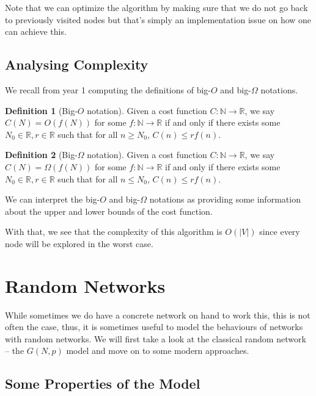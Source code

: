 \documentclass[
]{article}
\theoremstyle{definition}
\newtheorem{definition}{Definition}[section]
\begin{document}
Note that we can optimize the algorithm by making sure that we do not go
back to previously visited nodes but that's simply an implementation
issue on how one can achieve this.

\hypertarget{analysing-complexity}{%
\subsection{Analysing Complexity}\label{analysing-complexity}}

We recall from year 1 computing the definitions of big-\(O\) and
big-\(\Omega\) notations.

\begin{definition}[Big-\(O\) notation]
  Given a cost function \(C : \mathbb{N} \to \mathbb{R}\), we say 
  \(C(N) = O(f(N))\) for some \(f : \mathbb{N} \to \mathbb{R}\) if and only 
  if there exists some \(N_0 \in \mathbb{R}, r \in \mathbb{R}\) such that 
  for all \(n \ge N_0\), \(C(n) \le rf(n)\).
\end{definition}

\begin{definition}[Big-\(\Omega\) notation]
  Given a cost function \(C : \mathbb{N} \to \mathbb{R}\), we say 
  \(C(N) = \Omega(f(N))\) for some \(f : \mathbb{N} \to \mathbb{R}\) if and only 
  if there exists some \(N_0 \in \mathbb{R}, r \in \mathbb{R}\) such that 
  for all \(n \le N_0\), \(C(n) \le rf(n)\).
\end{definition}

We can interpret the big-\(O\) and big-\(\Omega\) notations as providing
some information about the upper and lower bounds of the cost function.

With that, we see that the complexity of this algorithm is
\(O(\left|V\right|)\) since every node will be explored in the worst
case.

\hypertarget{random-networks}{%
\section{Random Networks}\label{random-networks}}

While sometimes we do have a concrete network on hand to work this, this
is not often the case, thus, it is sometimes useful to model the
behaviours of networks with random networks. We will first take a look
at the classical random network -- the \(G(N, p)\) model and move on to
some modern approaches.

\hypertarget{some-properties-of-the-model}{%
\subsection{Some Properties of the
Model}\label{some-properties-of-the-model}}
\end{document}
